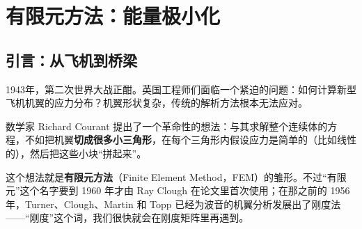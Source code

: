\chapter{有限元方法：能量极小化}

\section*{引言：从飞机到桥梁}

1943年，第二次世界大战正酣。英国工程师们面临一个紧迫的问题：如何计算新型飞机机翼的应力分布？机翼形状复杂，传统的解析方法根本无法应对。


数学家 Richard Courant 提出了一个革命性的想法：与其求解整个连续体的方程，不如把机翼\textbf{切成很多小三角形}，在每个三角形内假设应力是简单的（比如线性的），然后把这些小块``拼起来''。

这个想法就是\textbf{有限元方法}（Finite Element Method，FEM）的雏形。不过“有限元”这个名字要到 1960 年才由 Ray Clough 在论文里首次使用；在那之前的 1956 年，Turner、Clough、Martin 和 Topp 已经为波音的机翼分析发展出了刚度法——“刚度”这个词，我们很快就会在刚度矩阵里再遇到。

